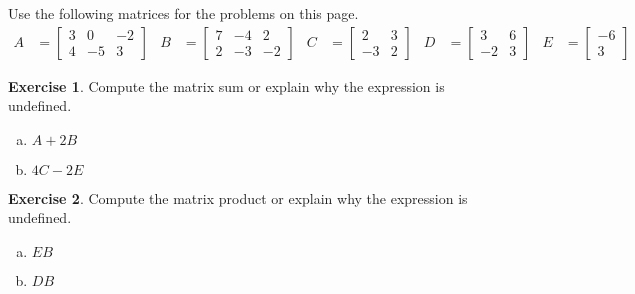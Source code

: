 \documentclass[10pt]{book}
\theoremstyle{definition}
\newtheorem{exercise}{Exercise}[section]
\begin{document}
Use the following matrices for the problems on this page.
\begin{align*}
A &= \begin{bmatrix}3&0&-2\\4&-5&3\end{bmatrix} &
B &= \begin{bmatrix}7&-4&2\\2&-3&-2\end{bmatrix} &
C &= \begin{bmatrix}2&3\\-3&2\end{bmatrix} &
D &= \begin{bmatrix}3&6\\-2&3\end{bmatrix} &
E &= \begin{bmatrix}-6\\3\end{bmatrix}
\end{align*}

\begin{exercise} %
	Compute the matrix sum or explain why the expression is undefined.
	\begin{multicols}{2}
		\begin{enumerate}[(a)]
			\item $A+2B$
			\item $4C-2E$
		\end{enumerate}
	\end{multicols}
\end{exercise}
\vfill


\begin{exercise} %
	Compute the matrix product or explain why the expression is undefined.
	\begin{multicols}{2}
		\begin{enumerate}[(a)]
			\item $EB$
			\item $DB$
		\end{enumerate}
	\end{multicols}
\end{exercise}
\vfill


\newpage
\end{document}
